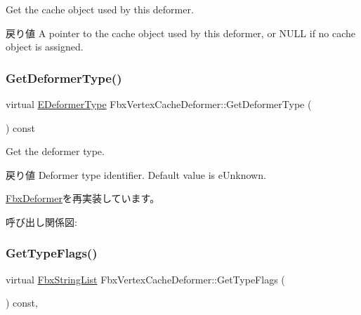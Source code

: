 Get the cache object used by this deformer. \begin{DoxyReturn}{戻り値}
A pointer to the cache object used by this deformer, or {\ttfamily N\+U\+LL} if no cache object is assigned. 
\end{DoxyReturn}
\mbox{\label{class_fbx_vertex_cache_deformer_ab213400e170fe58699649acaf652c787}} 
\subsubsection{\texorpdfstring{Get\+Deformer\+Type()}{GetDeformerType()}}
{\footnotesize\ttfamily virtual \hyperlink{class_fbx_deformer_a07e2cfb767191ba5c8799fdfbfe3eaf6}{E\+Deformer\+Type} Fbx\+Vertex\+Cache\+Deformer\+::\+Get\+Deformer\+Type (\begin{DoxyParamCaption}{ }\end{DoxyParamCaption}) const\hspace{0.3cm}{\ttfamily [virtual]}}

Get the deformer type. \begin{DoxyReturn}{戻り値}
Deformer type identifier. Default value is e\+Unknown. 
\end{DoxyReturn}


\hyperlink{class_fbx_deformer_adbc586e383f788f24d7fce9ed859d481}{Fbx\+Deformer}を再実装しています。

呼び出し関係図\+:
\mbox{\label{class_fbx_vertex_cache_deformer_a67322e24180497b1f268cad5ed29c08b}} 
\subsubsection{\texorpdfstring{Get\+Type\+Flags()}{GetTypeFlags()}}
{\footnotesize\ttfamily virtual \hyperlink{class_fbx_string_list}{Fbx\+String\+List} Fbx\+Vertex\+Cache\+Deformer\+::\+Get\+Type\+Flags (\begin{DoxyParamCaption}{ }\end{DoxyParamCaption}) const\hspace{0.3cm}{\ttfamily [protected]}, {\ttfamily [virtual]}}



